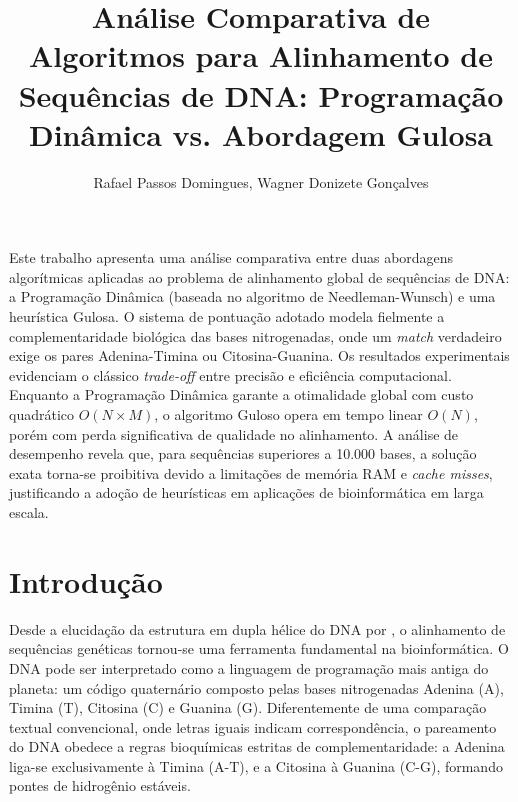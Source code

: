 \documentclass[12pt]{article}
\title{Análise Comparativa de Algoritmos para Alinhamento de Sequências de DNA: Programação Dinâmica vs. Abordagem Gulosa}
\author{
    Rafael Passos Domingues\inst{1}, 
    Wagner Donizete Gonçalves\inst{1}
}
\begin{document}
\maketitle

\begin{resumo}
    Este trabalho apresenta uma análise comparativa entre duas abordagens algorítmicas aplicadas ao problema de alinhamento global de sequências de DNA: a Programação Dinâmica (baseada no algoritmo de Needleman-Wunsch) e uma heurística Gulosa. O sistema de pontuação adotado modela fielmente a complementaridade biológica das bases nitrogenadas, onde um \textit{match} verdadeiro exige os pares Adenina-Timina ou Citosina-Guanina. Os resultados experimentais evidenciam o clássico \textit{trade-off} entre precisão e eficiência computacional. Enquanto a Programação Dinâmica garante a otimalidade global com custo quadrático $O(N \times M)$, o algoritmo Guloso opera em tempo linear $O(N)$, porém com perda significativa de qualidade no alinhamento. A análise de desempenho revela que, para sequências superiores a 10.000 bases, a solução exata torna-se proibitiva devido a limitações de memória RAM e \textit{cache misses}, justificando a adoção de heurísticas em aplicações de bioinformática em larga escala.
\end{resumo}

\section{Introdução}
\label{sec:introducao}

Desde a elucidação da estrutura em dupla hélice do DNA por \cite{watson:53}, o alinhamento de sequências genéticas tornou-se uma ferramenta fundamental na bioinformática. O DNA pode ser interpretado como a linguagem de programação mais antiga do planeta: um código quaternário composto pelas bases nitrogenadas Adenina (A), Timina (T), Citosina (C) e Guanina (G). Diferentemente de uma comparação textual convencional, onde letras iguais indicam correspondência, o pareamento do DNA obedece a regras bioquímicas estritas de complementaridade: a Adenina liga-se exclusivamente à Timina (A-T), e a Citosina à Guanina (C-G), formando pontes de hidrogênio estáveis.
\end{document}
